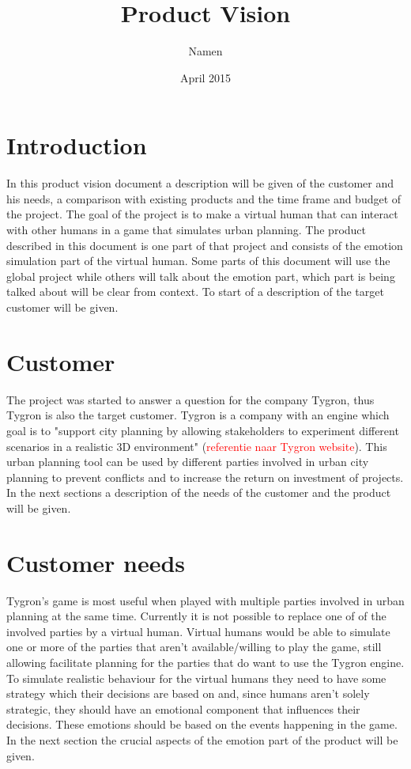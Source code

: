 \documentclass[11pt]{article}
\title{Product Vision}
\author{Namen}
\date{April 2015}
\begin{document}
\maketitle

\section*{Introduction}
In this product vision document a description will be given of the customer and his needs, a comparison with existing products and the time frame and budget of the project. The goal of the project is to make a virtual human that can interact with other humans in a game that simulates urban planning. The product described in this document is one part of that project and consists of the emotion simulation part of the virtual human. Some parts of this document will use the global project while others will talk about the emotion part, which part is being talked about will be clear from context. To start of a description of the target customer will be given. 

\section{Customer}
The project was started to answer a question for the company Tygron, thus Tygron is also the target customer. Tygron is a company with an engine which goal is to "support city planning by allowing stakeholders to experiment different scenarios in a realistic 3D environment" (\textcolor{red}{referentie naar Tygron website}). This urban planning tool can be used by different parties involved in urban city planning to prevent conflicts and to increase the return on investment of projects. In the next sections a description of the needs of the customer and the product will be given.

\section{Customer needs}
Tygron's game is most useful when played with multiple parties involved in urban planning at the same time. Currently it is not possible to replace one of of the involved parties by a virtual human. Virtual humans would be able to simulate one or more of the parties that aren't available/willing to play the game, still allowing facilitate planning for the parties that do want to use the Tygron engine. To simulate realistic behaviour for the virtual humans they need to have some strategy which their decisions are based on and, since humans aren't solely strategic, they should have an emotional component that influences their decisions. These emotions should be based on the events happening in the game. In the next section the crucial aspects of the emotion part of the product will be given.
\end{document}
